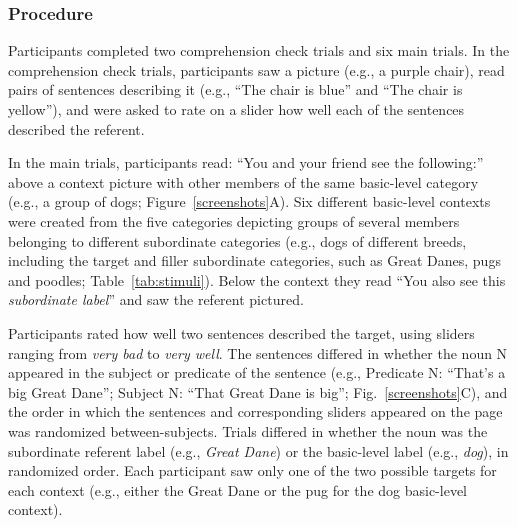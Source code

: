 \documentclass[a4paper,man,natbib]{apa6}
\begin{document}
\subsubsection{Procedure}
Participants completed two comprehension check trials and six main trials. In the comprehension check trials, participants saw a picture (e.g., a purple chair), read pairs of sentences describing it (e.g., ``The chair is blue'' and ``The chair is yellow''), and were asked to rate on a slider how well each of the sentences described the referent.

In the main trials, participants read: ``You and your friend see the following:'' above a context picture with other members of the same basic-level category (e.g., a group of dogs; Figure~\ref{screenshots}A). 
Six different basic-level contexts were created from the five categories depicting groups of several members belonging to different subordinate categories (e.g., dogs of different breeds, including the target and filler subordinate categories, such as Great Danes, pugs and poodles; Table~\ref{tab:stimuli}).
Below the context they read ``You also see this \emph{subordinate label}'' and saw the referent pictured.

Participants rated how well two sentences described the target, using sliders ranging from \textit{very bad} to \textit{very well}. The sentences differed in whether the noun N appeared in the subject or predicate of the sentence (e.g., Predicate N: ``That's a big Great Dane''; Subject N: ``That Great Dane is big''; Fig.~\ref{screenshots}C), and the order in which the sentences and corresponding sliders appeared on the page was randomized between-subjects. 
Trials differed in whether the noun was the subordinate referent label (e.g., \emph{Great Dane}) or the basic-level label (e.g., \emph{dog}), in randomized order. 
Each participant saw only one of the two possible targets for each context (e.g., either the Great Dane or the pug for the dog basic-level context).
\end{document}
